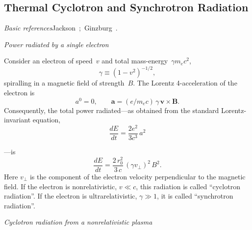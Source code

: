 
\subsection{Thermal Cyclotron and Synchrotron Radiation}
\label{sec:2.3}

\textit{Basic references}\quad Jackson~\cite{Jackson1962};\
Ginzburg~\cite{Ginzburg1967}.

\bigskip
\noindent\textit{Power radiated by a single electron}

\medskip
Consider an electron of speed~$v$ and total mass-energy~$\gamma m_e c^2$,
\begin{equation}
\gamma \equiv (1 - v^2)^{-1/2},
\tag{2.3.1}
\end{equation}
spiralling in a magnetic field of strength~$B$. The Lorentz 4-acceleration of the
electron is
\begin{equation}
a^0 = 0, \qquad
\mathbf{a} = (e / m_e c)\,\gamma\,\mathbf{v} \times \mathbf{B}.
\tag{2.3.2}
\end{equation}
Consequently, the total power radiated---as obtained from the standard
Lorentz-invariant equation,
\begin{equation}
\frac{dE}{dt} = \frac{2e^2}{3c^3}\,a^2
\tag{2.3.3}
\end{equation}

\noindent---is
\begin{equation}
\frac{dE}{dt} = \frac{2\,r_0^2}{3\,c}\,(\gamma v_\perp)^2\,B^2.
\tag{2.3.4}
\end{equation}
Here $v_\perp$ is the component of the electron velocity perpendicular to the magnetic
field. If the electron is nonrelativistic, $v \ll c$, this radiation is called ``cyclotron
radiation''. If the electron is ultrarelativistic, $\gamma \gg 1$, it is called ``synchrotron
radiation''.

\bigskip
\noindent\textit{Cyclotron radiation from a nonrelativistic plasma}

